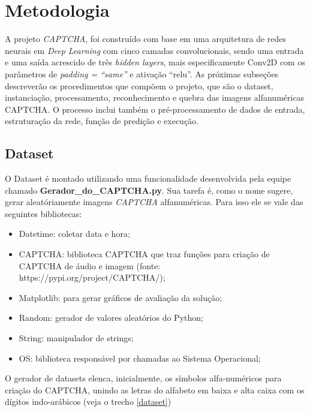 \section{Metodologia}
\label{SUBSEC:resourceAllocation}

A projeto \textit{CAPTCHA}, foi construído com base em uma arquitetura de redes neurais em \textit{Deep Learning} com cinco camadas convolucionais, sendo uma entrada e uma saída acrescido de três \textit{hidden layers}, mais especificamente Conv2D com os parâmetros de \textit{padding = ``same''} e ativação ``relu''. As próximas subseções descreverão os procedimentos que compõem o projeto, que são o dataset, instanciação, processamento, reconhecimento e quebra das imagens alfanuméricas CAPTCHA. O processo inclui também o pré-processamento de dados de entrada, estruturação da rede, função de predição e execução.

\subsection{Dataset}

O Dataset é montado utilizando uma funcionalidade desenvolvida pela equipe chamado \textbf{Gerador\_do\_CAPTCHA.py}. Sua tarefa é, como o nome sugere, gerar aleatóriamente imagens \textit{CAPTCHA} alfanuméricas. Para isso ele se vale das seguintes bibliotecas:

\begin{itemize}
    \item Datetime: coletar data e hora;
    \item CAPTCHA: biblioteca CAPTCHA que traz funções para criação de CAPTCHA de áudio e imagem (fonte: https://pypi.org/project/CAPTCHA/);
    \item Matplotlib: para gerar gráficos de avaliação da solução;
    \item Random: gerador de valores aleatórios do Python;
    \item String: manipulador de strings;
    \item OS: biblioteca responsável por chamadas ao Sistema Operacional;
\end{itemize}

O gerador de datasets elenca, inicialmente, os símbolos alfa-numéricos para criação do CAPTCHA, unindo as letras do alfabeto em baixa e alta caixa com os dígitos indo-arábicos (veja o trecho \ref{dataset})



